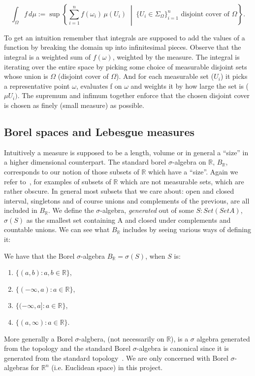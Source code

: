 \[
\int_{\Omega} f\,d\mu := \sup \left\{
\sum_{i=1}^{n} f(\omega_i)\,\mu(U_i)
\;\middle|\;
\{U_i \in \Sigma_\Omega\}_{i=1}^{n} \text{ disjoint cover of } \Omega
\right\}.
\]

To get an intuition remember that integrals are supposed to add the values of a function by breaking the domain up into infinitesimal pieces.
Observe that the integral is a weighted sum of $f(\omega)$, weighted by the measure. The integral is iterating over the entire space
by picking some choice of measurable disjoint sets whose union is $\Omega$ (disjoint cover of $\Omega$). And for each measurable set ($U_i$) it picks a representative
point $\omega$, evaluates f on $\omega$ and weights it by how large the set is ($\mu U_i)$. The supremum and infimum together enforce that the chosen disjoint
cover is chosen as finely (small measure) as possible.

\subsection{Borel spaces and Lebesgue measures}
Intuitively a measure is supposed to be a length, volume or in general a ``size'' in a higher dimensional counterpart. 
The standard borel $\sigma$-algebra on $\mathbb{R}$, $B_\mathbb{R}$, corresponds to our notion of those subsets of $\mathbb{R}$ which have a ``size''. Again we refer
to~\citet[Chapter 2]{axler}, for examples of subsets of $\mathbb{R}$ which are not measurable sets, which are rather obscure. In general
most subsets that we care about: open and closed interval, singletons and of course unions and complements of the previous, are all included in $B_\mathbb{R}$.
We define the $\sigma$-algebra, \emph{generated} out of some $S : Set (Set A)$, $\sigma(S)$ as the smallest set containing A and closed under complements
and countable unions. We can see what $B_\mathbb{R}$ includes by seeing various ways of defining it:

We have that the Borel $\sigma$-algebra $B_\mathbb{R} = \sigma(S)$, when $S$ is:
\begin{enumerate}
  \item[(a)] $\{(a, b) : a, b \in \mathbb{R}\}$,
  \item[(b)] $\{(-\infty, a) : a \in \mathbb{R}\}$,
  \item[(c)] $\{(-\infty, a] : a \in \mathbb{R}\}$,
  \item[(d)] $\{(a, \infty) : a \in \mathbb{R}\}$.
\end{enumerate}

More generally a Borel $\sigma$-algbera, (not necessarily on $\mathbb{R}$), is a $\sigma$ algebra generated from the topology and the standard Borel
$\sigma$-algebra is canonical since it is generated from the standard topology~\citep{axler}. We are only concerned with Borel $\sigma$-algebras for $\mathbb{R}^n$ (i.e. Euclidean space) in
this project.


